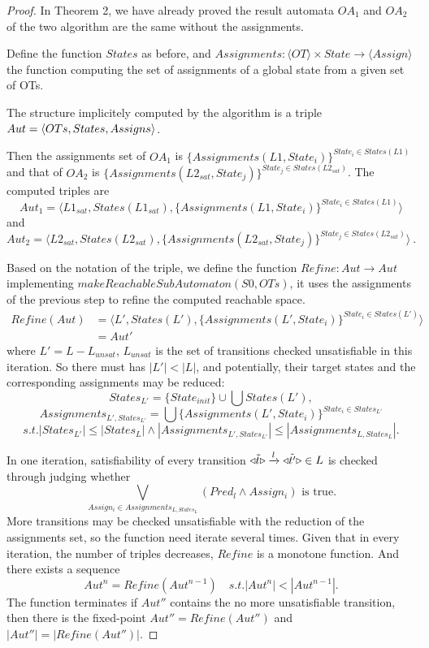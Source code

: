 \documentclass[smallcondensed]{svjour3}
\newcommand{\TODO}[1]{\textcolor{red}{\textbf{[TODO:#1]}}}
\begin{document}
\begin{proof}
In Theorem 2, we have already proved the result automata $OA_1$ and $OA_2$ of the two algorithm are the same without the assignments.

Define the function $States$ as before, and  $Assignments : \langle OT\rangle\times State\rightarrow\langle Assign\rangle$ the function
computing the set of assignments of a global state from a given set of OTs.

The structure implicitely computed by the algorithm is a triple $ Aut= \langle OTs, States,\\ Assigns\rangle$.

Then the assignments set of $OA_1$ is $\{Assignments(L1, State_{i})\}^{State_{i}\in States(L1)}$ and that of $OA_2$ is $\{Assignments(L2_{sat}, State_{j})\}^{State_{j}\in States(L2_{sat})}$. The computed triples are 
\[Aut_1 = \langle L1_{sat}, States(L1_{sat}), \{Assignments(L1, State_{i})\}^{State_{i}\in States(L1)}\rangle\] and \[Aut_2 = \langle L2_{sat}, States(L2_{sat}), \{Assignments(L2_{sat}, State_{j})\}^{State_{j}\in States(L2_{sat})}\rangle \ . \]

Based on the notation of the triple, we define the function $Refine : Aut \rightarrow Aut$ implementing $makeReachableSubAutomaton(S0,OTs)$, it uses the assignments of the previous step to refine the computed reachable space.
\begin{align*}
Refine(Aut) &=\langle L', States(L'), \{Assignments(L', State_{i})\}^{State_{i}\in States(L')}\rangle \\
&=Aut'
\end{align*}
where $L' = L - L_{unsat}$, $L_{unsat}$ is the set of transitions checked unsatisfiable in this iteration. So there must has $|L'|<|L|$, and potentially, their target states and the corresponding assignments may be reduced: 
\[States_{L'}=\{State_{init}\}\cup \bigcup States(L'),\]
\[Assignments_{L',States_{L'}}=\bigcup\{Assignments(L', State_{i})\}^{State_{i}\in States_{L'}} \]
\[s.t. |States_{L'}|\le|States_{L}|\wedge|Assignments_{L',States_{L'}}|\le|Assignments_{L,States_{L}}|.\]

In one iteration, satisfiability of every transition $\triangleleft{\tilde{t}}\triangleright\xrightarrow{l}\triangleleft{\tilde{t'}}\triangleright\in L$ is checked through judging whether 
\[\bigvee_{Assign_i\in Assignments_{L, States_{L}}}(Pred_{l}\wedge Assign_{i})\text{ is true}.\]
More transitions may be checked unsatisfiable with the reduction of the assignments set, so the function need iterate several times. Given that in every iteration, the number of triples decreases, $Refine$ is a monotone function. And there exists a sequence \[Aut^n = Refine(Aut^{n-1})\quad s.t. |Aut^n| < |Aut^{n-1}|.\]
The function terminates if $Aut''$ contains the no more unsatisfiable transition, then there is the fixed-point $Aut'' = Refine(Aut'')$ and $|Aut''| = |Refine(Aut'')|$.


\end{proof}
\end{document}
